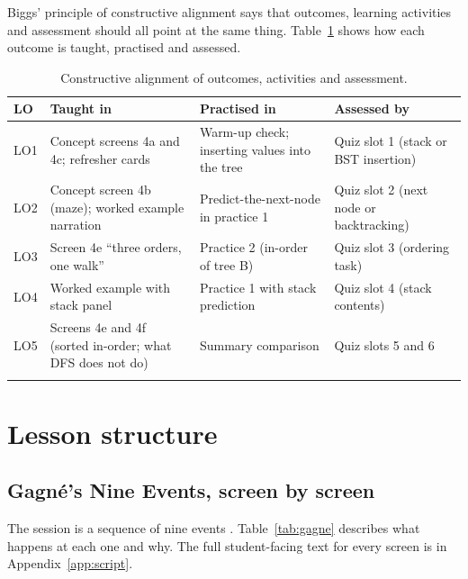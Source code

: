 \documentclass[11pt,a4paper]{article}
\begin{document}
Biggs' principle of constructive alignment \cite{biggs1996} says that outcomes, learning activities
and assessment should all point at the same thing. Table~\ref{tab:align} shows how each outcome is
taught, practised and assessed.

\begin{longtable}{@{}p{0.9cm} p{4.6cm} p{4.6cm} p{4.8cm}@{}}
  \toprule
  \textbf{LO} & \textbf{Taught in} & \textbf{Practised in} & \textbf{Assessed by} \\
  \midrule
  \endhead
  LO1 & Concept screens 4a and 4c; refresher cards & Warm-up check; inserting values into the tree &
        Quiz slot 1 (stack or BST insertion) \\
  LO2 & Concept screen 4b (maze); worked example narration & Predict-the-next-node in practice 1 &
        Quiz slot 2 (next node or backtracking) \\
  LO3 & Screen 4e ``three orders, one walk'' & Practice 2 (in-order of tree B) &
        Quiz slot 3 (ordering task) \\
  LO4 & Worked example with stack panel & Practice 1 with stack prediction &
        Quiz slot 4 (stack contents) \\
  LO5 & Screens 4e and 4f (sorted in-order; what DFS does not do) & Summary comparison &
        Quiz slots 5 and 6 \\
  \bottomrule
  \caption{Constructive alignment of outcomes, activities and assessment.}
  \label{tab:align}
\end{longtable}

\section{Lesson structure}
\label{sec:lesson}

\subsection{Gagné's Nine Events, screen by screen}

The session is a sequence of nine events \cite{gagne2005}. Table~\ref{tab:gagne} describes what
happens at each one and why. The full student-facing text for every screen is in
Appendix~\ref{app:script}.
\end{document}
